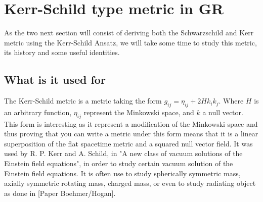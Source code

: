 \documentclass[a4paper,12pt]{article}
\theoremstyle{definition}
\begin{document}
\section{Kerr-Schild type metric in GR}
As the two next section will consist of deriving both the Schwarzschild and Kerr metric using the Kerr-Schild Ansatz,
we will take some time to study this metric, its history and some useful identities.
\subsection{What is it used for}
The Kerr-Schild metric is a metric taking the form $g_{ij}=\eta_{ij}+2Hk_ik_j$.
Where $H$ is an arbitrary function, $\eta_{ij}$ represent the Minkowski space, and $k$ a null vector.
This form is interesting as it represent a modification of the Minkowski space and thus proving that you can write a metric under this form means that it is a linear superposition of the flat spacetime metric and a squared null vector field.
It was used by R. P. Kerr and A. Schild, in "A new class of vacuum solutions of the Einstein field equations", in order to study certain vacuum solution of the Einstein field equations.
It is often use to study spherically symmetric mass, axially symmetric rotating mass, charged mass, or even to study radiating object as done in [Paper Boehmer/Hogan].
\end{document}
